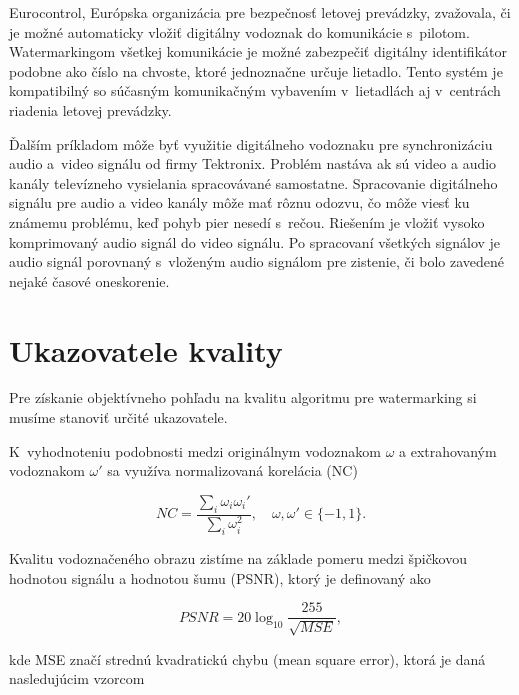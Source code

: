 Eurocontrol, Európska organizácia pre bezpečnosť letovej prevádzky, zvažovala, či je možné automaticky vložiť digitálny vodoznak do komunikácie s~pilotom. Watermarkingom všetkej komunikácie je možné zabezpečiť digitálny identifikátor podobne ako číslo na chvoste, ktoré jednoznačne určuje lietadlo. Tento systém je kompatibilný so súčasným komunikačným vybavením v~lietadlách aj v~centrách riadenia letovej prevádzky.

Ďalším príkladom môže byť využitie digitálneho vodoznaku pre synchronizáciu audio a~video signálu od firmy Tektronix. Problém nastáva ak sú video a audio kanály televízneho vysielania spracovávané samostatne. Spracovanie digitálneho signálu pre audio a video kanály môže mať rôznu odozvu, čo môže viesť ku známemu problému, keď pohyb pier nesedí s~rečou. Riešením je vložiť vysoko komprimovaný audio signál do video signálu. Po spracovaní všetkých signálov je audio signál porovnaný s~vloženým audio signálom pre zistenie, či bolo zavedené nejaké časové oneskorenie. \cite{Cox}


\section{Ukazovatele kvality}
Pre získanie objektívneho pohľadu na kvalitu algoritmu pre watermarking si musíme stanoviť určité ukazovatele.

K~vyhodnoteniu podobnosti medzi originálnym vodoznakom $\omega$ a extrahovaným vodoznakom $\omega'$ sa využíva normalizovaná korelácia (NC) \cite{QRdecomposition}

\begin{equation}
NC = \frac{\sum_i \omega_i \omega_i'}{\sum_i \omega_i^2},\quad \omega,\omega'\in \{-1,1\}.
\end{equation}

Kvalitu vodoznačeného obrazu zistíme na základe pomeru medzi špičkovou hodnotou signálu a hodnotou šumu (PSNR), ktorý je definovaný ako

\begin{equation}
PSNR = 20\log_{10} \frac{255}{\sqrt{MSE}},
\end{equation}

kde MSE značí strednú kvadratickú chybu (mean square error), ktorá je daná nasledujúcim vzorcom

